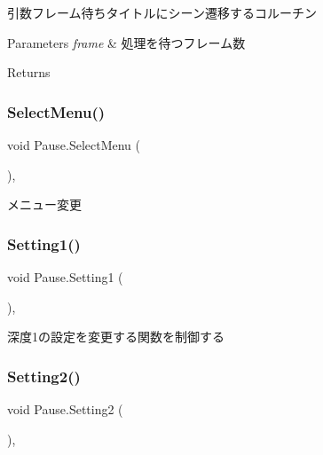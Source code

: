 引数フレーム待ちタイトルにシーン遷移するコルーチン 


\begin{DoxyParams}{Parameters}
{\em frame} & 処理を待つフレーム数\\
\hline
\end{DoxyParams}
\begin{DoxyReturn}{Returns}

\end{DoxyReturn}
\mbox{\label{class_pause_ab00490b873a9359aae7e84f9145e6b6e}} 
\subsubsection{\texorpdfstring{Select\+Menu()}{SelectMenu()}}
{\footnotesize\ttfamily void Pause.\+Select\+Menu (\begin{DoxyParamCaption}{ }\end{DoxyParamCaption})\hspace{0.3cm}{\ttfamily [inline]}, {\ttfamily [private]}}



メニュー変更 

\mbox{\label{class_pause_ae232ecdb930782ddadd1c8ff94b5a232}} 
\subsubsection{\texorpdfstring{Setting1()}{Setting1()}}
{\footnotesize\ttfamily void Pause.\+Setting1 (\begin{DoxyParamCaption}{ }\end{DoxyParamCaption})\hspace{0.3cm}{\ttfamily [inline]}, {\ttfamily [private]}}



深度1の設定を変更する関数を制御する 

\mbox{\label{class_pause_a8fde416d52c686a5df745b56193703cd}} 
\subsubsection{\texorpdfstring{Setting2()}{Setting2()}}
{\footnotesize\ttfamily void Pause.\+Setting2 (\begin{DoxyParamCaption}{ }\end{DoxyParamCaption})\hspace{0.3cm}{\ttfamily [inline]}, {\ttfamily [private]}}



